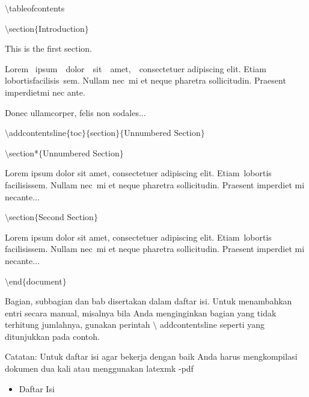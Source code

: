 \begin{itemize}
$\setminus$tableofcontents\par

$\setminus$section$ \{ $Introduction$ \} $\par

This is the first section.\par

Lorem~ ipsum~~dolor~~sit~~amet,~~consectetuer  adipiscing  elit.   Etiam~ lobortisfacilisis~sem.  Nullam nec~mi et neque pharetra sollicitudin.  Praesent imperdietmi nec ante. \par

Donec ullamcorper, felis non sodales...\par

$\setminus$addcontentsline$ \{ $toc$ \} $$ \{ $section$ \} $$ \{ $Unnumbered Section$ \} $\par

$\setminus$section*$ \{ $Unnumbered Section$ \} $\par

Lorem ipsum dolor sit amet, consectetuer adipiscing elit. Etiam~lobortis facilisissem.  Nullam nec~mi et neque pharetra sollicitudin.  Praesent imperdiet mi necante...\par

$\setminus$section$ \{ $Second Section$ \} $\par

Lorem ipsum dolor sit amet, consectetuer adipiscing elit. Etiam~lobortis facilisissem.  Nullam nec~mi et neque pharetra sollicitudin.  Praesent imperdiet mi necante...\par

$\setminus$end$ \{ $document$ \} $\par
\vspace{\baselineskip}
Bagian, subbagian dan bab disertakan dalam daftar isi. Untuk menambahkan entri secara manual, misalnya bila Anda menginginkan bagian yang tidak terhitung jumlahnya, gunakan perintah $\setminus$ addcontentsline seperti yang ditunjukkan pada contoh.\par
\vspace{\baselineskip}
Catatan: Untuk daftar isi agar bekerja dengan baik Anda harus mengkompilasi dokumen dua kali atau menggunakan latexmk -pdf\par


\begin{itemize}
	\item Daftar Isi
\end{itemize}


\end{itemize}
